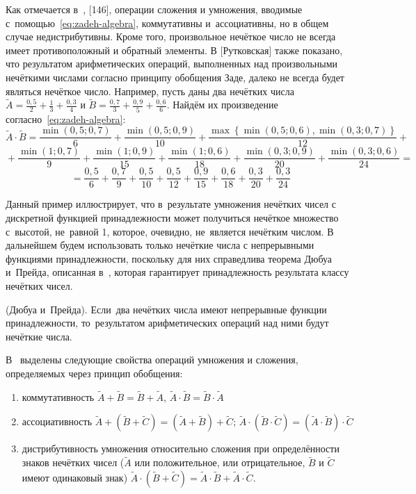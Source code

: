 Как отмечается в~\cite{Borisov_Alexeev_Msk, Yakhyaeva}, [146], операции сложения и умножения, вводимые с~помощью~\eqref{eq:zadeh-algebra}, коммутативны и~ассоциативны, но в общем случае недистрибутивны. Кроме того, произвольное нечёткое число не всегда имеет противоположный и обратный элементы. В [Рутковская] также показано, что результатом арифметических операций, выполненных над произвольными нечёткими числами согласно принципу обобщения Заде, далеко не всегда будет являться нечёткое число. Например, пусть даны два нечётких числа $\displaystyle \tilde{A}=\frac{0,5}{2}+\frac{1}{3}+\frac{0,3}{4}$ и $\displaystyle \tilde{B}=\frac{0,7}{3}+\frac{0,9}{5}+\frac{0,6}{6}$. Найдём их произведение согласно~\eqref{eq:zadeh-algebra}:
\[
	\tilde{A}\cdot \tilde{B}=\frac{\min \left( 0,5;0,7 \right)}{6}+\frac{\min \left( 0,5;0,9 \right)}{10}+		\frac{\max \left\{ \min \left( 0,5;0,6 \right),\min \left( 0,3;0,7 \right) \right\}}{12}+{}
\]
\[  
	{} +\frac{\min \left( 1;0,7 \right)}{9}+\frac{\min \left( 1;0,9 \right)}{15}+\frac{\min \left( 1;0,6 \right)}{18}+\frac{\min \left( 0,3;0,9 \right)}{20}+\frac{\min \left( 0,3;0,6 \right)}{24}={}
\]
\[  
	{}=\frac{0,5}{6}+\frac{0,7}{9}+\frac{0,5}{10}+\frac{0,5}{12}+\frac{0,9}{15}+\frac{0,6}{18}+\frac{0,3}{20}+\frac{0,3}{24}
\] 

Данный пример иллюстрирует, что в~результате умножения нечётких чисел с дискретной функцией принадлежности может получиться нечёткое множество с~высотой, не~равной 1, которое, очевидно, не~является нечётким числом. В дальнейшем будем использовать только нечёткие числа с непрерывными функциями принадлежности, поскольку для них справедлива теорема Дюбуа и~Прейда, описанная в~\cite{Rutkovskaya}, которая гарантирует принадлежность результата классу нечётких чисел.
\begin{theorem}
(Дюбуа и~Прейда). Если~два нечётких числа имеют непрерывные функции принадлежности, то~результатом арифметических операций над ними будут нечёткие числа.
\end{theorem}

В~\cite{Pospelov} выделены следующие свойства операций умножения и сложения, определяемых через принцип обобщения:
\begin{enumerate}
	\item коммутативность $\tilde{A}+\tilde{B}=\tilde{B}+\tilde{A}$, $\tilde{A}\cdot \tilde{B}=\tilde{B}\cdot \tilde{A}$ 
	\item ассоциативность $\tilde{A}+\left( \tilde{B}+\tilde{C} \right)=\left( \tilde{A}+\tilde{B} \right)+\tilde{C}$; $\tilde{A}\cdot \left( \tilde{B}\cdot \tilde{C} \right)=\left( \tilde{A}\cdot \tilde{B} \right)\cdot \tilde{C}$ 
	\item дистрибутивность умножения относительно сложения при определённости знаков нечётких чисел ($\tilde{A}$ или положительное, или отрицательное, $\tilde{B}$ и $\tilde{C}$ имеют одинаковый знак) $\tilde{A}\cdot \left( \tilde{B}+\tilde{C} \right)=\tilde{A}\cdot \tilde{B}+\tilde{A}\cdot \tilde{C}$.
\end{enumerate}

